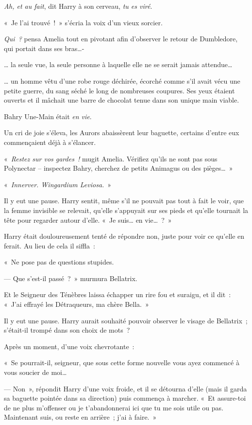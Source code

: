 \emph{Ah, et au fait}, dit Harry à son cerveau, \emph{tu es viré}.

\later

«~Je l'ai trouvé~!~»
 s'écria la voix d'un vieux sorcier.

\emph{Qui~?} pensa Amelia tout en pivotant afin d'observer le retour de Dumbledore, qui portait dans ses bras…-

… la seule vue, la seule personne à laquelle elle ne se serait jamais attendue…

… un homme vêtu d'une robe rouge déchirée, écorché comme s'il avait vécu une petite guerre, du sang séché le long de nombreuses coupures.
Ses yeux étaient ouverts et il mâchait une barre de chocolat tenue dans son unique main viable.

Bahry Une-Main était \emph{en vie}.

Un cri de joie s'éleva, les Aurors abaissèrent leur baguette, certains d'entre eux commençaient déjà à s'élancer.

«~\emph{Restez sur vos gardes~!} mugit Amelia.
Vérifiez qu'ils ne sont pas sous Polynectar -- inspectez Bahry, cherchez de petits Animagus ou des pièges…~»

\later

«~\emph{Innerver.
Wingardium Leviosa.}~»

Il y eut une pause.
Harry sentit, même s'il ne pouvait pas tout à fait le voir, que la femme invisible se relevait, qu'elle s'appuyait sur ses pieds et qu'elle tournait la tête pour regarder autour d'elle.
«~Je suis… en vie…~?~»

Harry était douloureusement tenté de répondre non, juste pour voir ce qu'elle en ferait.
Au lieu de cela il siffla~:

«~Ne pose pas de questions stupides.

--- Que s'est-il passé~?~»
murmura Bellatrix.

Et le Seigneur des Ténèbres laissa échapper un rire fou et suraigu, et il dit~: «~J'ai effrayé les Détraqueurs, ma chère Bella.~»

Il y eut une pause.
Harry aurait souhaité pouvoir observer le visage de Bellatrix~; s'était-il trompé dans son choix de mots~?

Après un moment, d'une voix chevrotante~:

«~Se pourrait-il, seigneur, que sous cette forme nouvelle vous ayez commencé à vous soucier de moi…

--- Non~», répondit Harry d'une voix froide, et il se détourna d'elle (mais il garda sa baguette pointée dans sa direction) puis commença à marcher.
«~Et assure-toi de ne plus m'offenser ou je t'abandonnerai ici que tu me sois utile ou pas.
Maintenant suis, ou reste en arrière~; j'ai à faire.~»

